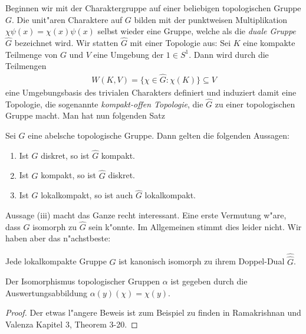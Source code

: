 	Beginnen wir mit der Charaktergruppe auf einer beliebigen topologischen Gruppe $G$.
	Die unit"aren Charaktere auf $G$ bilden mit der punktweisen Multiplikation $\chi\psi (x) = \chi(x) \psi (x)$ selbst wieder eine Gruppe, welche als die \emph{duale Gruppe $\hat{G}$} bezeichnet wird.
	Wir statten $\hat{G}$ mit einer Topologie aus:
	Sei $K$ eine kompakte Teilmenge von $G$ und $V$ eine Umgebung der $1\in S^1$.
	Dann wird durch die Teilmengen
	\begin{align*}
		W(K, V) = \{ \chi \in \hat{G}: \chi(K)\} \subseteq V
	\end{align*}
	eine Umgebungsbasis des trivialen Charakters definiert und induziert damit eine Topologie, die sogenannte \emph{kompakt-offen Topologie}, die $\hat{G}$ zu einer topologischen Gruppe macht.
	Man hat nun folgenden Satz
	\begin{satz} Sei $G$ eine abelsche topologische Gruppe. Dann gelten die folgenden Aussagen:
		\begin{enumerate}[label=\emph{(\roman*)}]
			\item Ist $G$ diskret, so ist $\hat{G}$ kompakt.
			\item Ist $G$ kompakt, so ist $\hat{G}$ diskret.
			\item Ist $G$ lokalkompakt, so ist auch $\hat{G}$ lokalkompakt.
		\end{enumerate}
	\end{satz}
	Aussage (iii) macht das Ganze recht interessant.
	Eine erste Vermutung w"are, dass $G$ isomorph zu $\hat{G}$ sein k"onnte.
	Im Allgemeinen stimmt dies leider nicht. 
	Wir haben aber das n"achstbeste:
	\begin{satz}
		Jede lokalkompakte Gruppe $G$ ist kanonisch isomorph zu ihrem Doppel-Dual $\hat{\hat{G}}$.
	\end{satz}
	Der Isomorphismus topologischer Gruppen $\alpha$ ist gegeben durch die Auswertungsabbildung $\alpha(y)(\chi) = \chi(y)$.
	\begin{proof}
		Der etwas l"angere Beweis ist zum Beispiel zu finden in Ramakrishnan und Valenza \cite{rama} Kapitel 3, Theorem 3-20.
	\end{proof}
	
